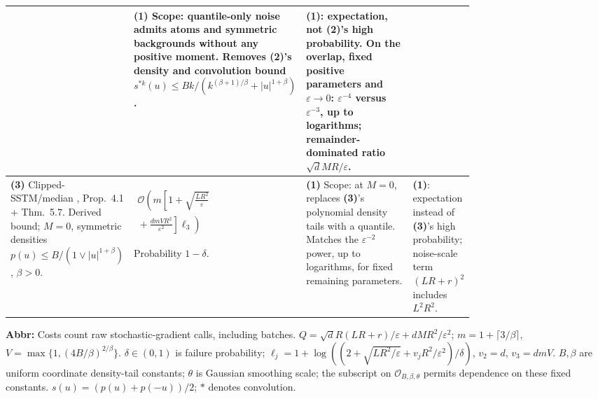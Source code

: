 \begin{table}[tp]
\begin{threeparttable}
\begin{tabularx}{\linewidth}{@{}>{\raggedright\arraybackslash}p{0.20\linewidth}>{\raggedright\arraybackslash}p{0.32\linewidth}>{\raggedright\arraybackslash}p{0.25\linewidth}>{\raggedright\arraybackslash}X@{}}
& \textbf{(1)} Scope: quantile-only noise admits atoms and symmetric backgrounds without any positive moment. Removes \textbf{(2)}'s density and convolution bound $s^{*k}(u)\le Bk/(k^{(\beta+1)/\beta}+|u|^{1+\beta})$.
& \textbf{(1)}: expectation, not \textbf{(2)}'s high probability. On the overlap, fixed positive parameters and $\varepsilon\to0$: $\varepsilon^{-4}$ versus $\varepsilon^{-3}$, up to logarithms; remainder-dominated ratio $\sqrt d MR/\varepsilon$. \\
\midrule
\textbf{(3)} Clipped-SSTM/median \citep{qsrcPuchkin2024v2}, Prop.~4.1 + Thm.~5.7. Derived bound; $M=0$, symmetric densities $p(u)\le B/(1\vee|u|^{1+\beta})$, $\beta>0$.
& $\begin{gathered}\mathcal{O}\!\left(m\left[1+\sqrt{\frac{LR^2}{\varepsilon}}\right.\right.\\[-2pt]\left.\left.{}+\frac{dmVR^2}{\varepsilon^2}\right]\ell_3\right)\end{gathered}$\par Probability $1-\delta$.
& \textbf{(1)} Scope: at $M=0$, replaces \textbf{(3)}'s polynomial density tails with a quantile. Matches the $\varepsilon^{-2}$ power, up to logarithms, for fixed remaining parameters.
& \textbf{(1)}: expectation instead of \textbf{(3)}'s high probability; noise-scale term $(LR+r)^2$ includes $L^2R^2$. \\
\bottomrule
\end{tabularx}
\begin{tablenotes}[flushleft]\footnotesize
\item[] \textbf{Abbr:} Costs count raw stochastic-gradient calls, including batches. $Q=\sqrt d R(LR+r)/\varepsilon+dMR^2/\varepsilon^2$; $m=1+\lceil3/\beta\rceil$, $V=\max\{1,(4B/\beta)^{2/\beta}\}$. $\delta\in(0,1)$ is failure probability; $\ell_j=1+\log((2+\sqrt{LR^2/\varepsilon}+v_jR^2/\varepsilon^2)/\delta)$, $v_2=d$, $v_3=dmV$. $B,\beta$ are uniform coordinate density-tail constants; $\theta$ is Gaussian smoothing scale; the subscript on $\mathcal{O}_{B,\beta,\theta}$ permits dependence on these fixed constants. $s(u)=(p(u)+p(-u))/2$; $*$ denotes convolution.
\end{tablenotes}
\end{threeparttable}
\end{table}
\clearpage
